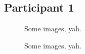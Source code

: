 \clearpage

\subsection{Participant 1}

\begin{figure}[h]
	\caption{Some images, yah.}
\end{figure}

\lipsum[1]

\clearpage

\begin{figure}[h]
	\caption{Some images, yah.}
\end{figure}

